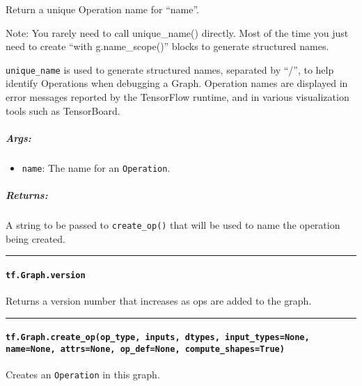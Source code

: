 Return a unique Operation name for ``name''.

Note: You rarely need to call unique_name() directly. Most of the time
you just need to create ``with g.name_scope()'' blocks to generate
structured names.

\lstinline{unique_name} is used to generate structured names, separated by
``/'', to help identify Operations when debugging a Graph. Operation
names are displayed in error messages reported by the TensorFlow
runtime, and in various visualization tools such as TensorBoard.

\subparagraph{Args: }\label{args-9}

\begin{itemize}
\tightlist
\item
  \lstinline{name}: The name for an \lstinline{Operation}.
\end{itemize}

\subparagraph{Returns: }\label{returns-11}

A string to be passed to \lstinline{create_op()} that will be used to name
the operation being created.

\begin{center}\rule{0.5\linewidth}{\linethickness}\end{center}

\paragraph{\texorpdfstring{\lstinline{tf.Graph.version}
}{tf.Graph.version }}\label{tf.graph.version}

Returns a version number that increases as ops are added to the graph.

\begin{center}\rule{0.5\linewidth}{\linethickness}\end{center}

\paragraph{\texorpdfstring{\lstinline{tf.Graph.create_op(op_type, inputs, dtypes, input_types=None, name=None, attrs=None, op_def=None, compute_shapes=True)}
}{tf.Graph.create_op(op_type, inputs, dtypes, input_types=None, name=None, attrs=None, op_def=None, compute_shapes=True) }}\label{tf.graph.createux5fopopux5ftype-inputs-dtypes-inputux5ftypesnone-namenone-attrsnone-opux5fdefnone-computeux5fshapestrue}

Creates an \lstinline{Operation} in this graph.

